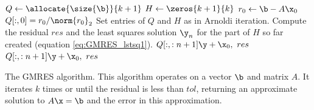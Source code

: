 \begin{algorithm}
\begin{algorithmic}[1]
	\State $Q \gets \allocate{\size{\b}}{k+1}$			
	\State $H \gets \zeros{k+1}{ k}$
	\State $r_0 \gets \b - A\x_0$
	\State $Q[:,0] = r_0/\norm{r_0}_2$
        \State Set entries of $Q$ and $H$ as in Arnoldi iteration.
        \State Compute the residual $res$ and the least squares solution $\y_n$ for the part of $H$ so far created (equation \ref {eq:GMRES_lstsq1}).
            \State {} $Q[:,:n+1]\y + \x_0, \,\, res$
        \EndIf
    \EndFor
    \State {} $Q[:,:n+1]\y + \x_0, \,\, res$
\EndProcedure
\end{algorithmic}
\caption{The GMRES algorithm. This algorithm operates on a vector $\b$ and matrix $A$.
It iterates $k$ times or until the residual is less than $tol$, returning an approximate solution to $A\x=\b$ and the error in this approximation.}
\label{alg:gmres}
\end{algorithm}


